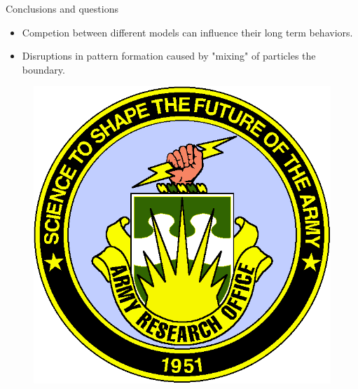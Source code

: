 \documentclass{beamer}
\begin{document}
    \begin{frame}[t]{Conclusions and questions}
        \begin{itemize}
            \item Competion between different models can influence their long term behaviors.

            \item Disruptions in pattern formation caused by "mixing" of particles
                  the boundary.

        \end{itemize}

        \begin{figure}[t]
            \centering
            \includegraphics[width=0.2\linewidth]{images/aro_logo_t.png}
            \label{fig:aro_logo_t}
        \end{figure}
    \end{frame}
\end{document}
